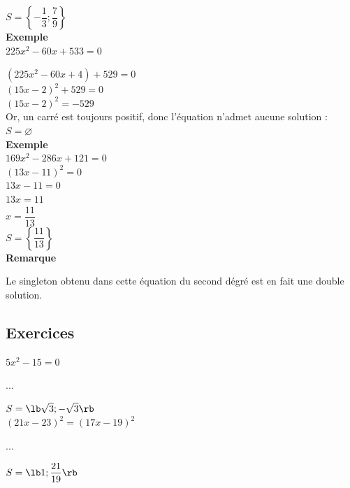 $ S = \left\lbrace -\dfrac{1}{3} ; \dfrac{7}{9} \right\rbrace $ \\

\textbf{Exemple }\\

$ 225x^2 - 60x + 533 = 0 $

$ \left(225x^2 - 60x +4\right) + 529 = 0 $\\

$ \left(15x-2\right)^2 + 529 = 0 $\\

$ \left(15x-2\right)^2 = -529 $ \\

Or, un carré est toujours positif, donc l'équation n'admet aucune solution : \\

$ S = \varnothing $ \\

\textbf{Exemple }\\

$ 169x^2 - 286x + 121 = 0 $\\

$ \left(13x - 11\right)^2 = 0 $\\ 

$ 13x - 11 = 0 $\\

$ 13x = 11 $ \\

$ x = \dfrac{11}{13} $ \\

$ S = \left\lbrace \dfrac{11}{13} \right\rbrace $ \\

\textbf{Remarque}

Le singleton obtenu dans cette équation du second dégré est en fait une double solution.

\newpage

\subsection{Exercices}

$ 5x^2 - 15 = 0 $

...

$ S = \lb \sqrt{3} ; -\sqrt{3} \rb $ \\

$ \left(21x - 23\right)^2 = \left(17x - 19\right)^2 $

...

$ S = \lb 1 ; \dfrac{21}{19} \rb $ \\

